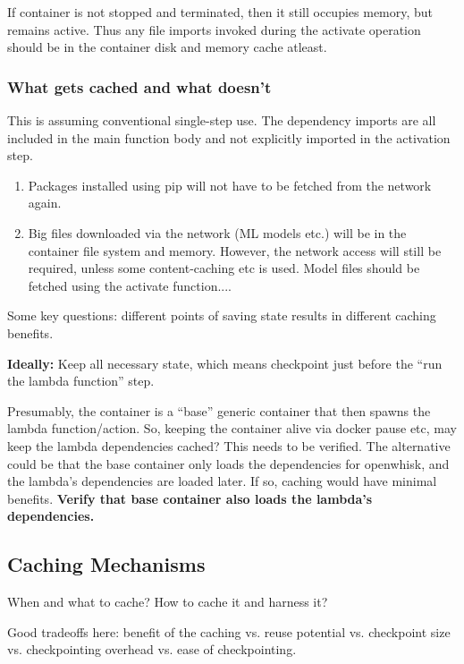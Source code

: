 If container is not stopped and terminated, then it still occupies memory, but remains active. Thus any file imports invoked during the activate operation should be in the container disk and memory cache atleast.

\subsubsection{What gets cached and what doesn't} 

This is assuming conventional single-step use. The dependency imports are all included in the main function body and not explicitly imported in the activation step.

\begin{enumerate}
\item Packages installed using pip will not have to be fetched from the network again. 
\item Big files downloaded via the network (ML models etc.) will be in the container file system and memory. However, the network access will still be required, unless some content-caching etc is used. Model files should be fetched using the activate function....
\end{enumerate}





Some key questions: different points of saving state results in different caching benefits.

\textbf{Ideally:} Keep all necessary state, which means checkpoint just before the ``run the lambda function'' step.

Presumably, the container is a ``base'' generic container that then spawns the lambda function/action. So, keeping the container alive via docker pause etc, may keep the lambda dependencies cached? This needs to be verified. The alternative could be that the base container only loads the dependencies for openwhisk, and the lambda's dependencies are loaded later. If so, caching would have minimal benefits. \textbf{Verify that base container also loads the lambda's dependencies.}


\subsection{Caching Mechanisms}

When and what to cache? How to cache it and harness it?

Good tradeoffs here: benefit of the caching vs. reuse potential vs. checkpoint size vs. checkpointing overhead vs. ease of checkpointing. 




